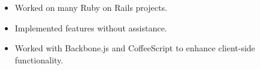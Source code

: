 \documentclass[10pt,letterpaper]{article}
\begin{document}
\begin{itemize}
    \begin{itemize}[label=\textbullet]
      \itemsep0em
      \item Worked on many Ruby on Rails projects.
      \item Implemented features without assistance.
      \item Worked with Backbone.js and CoffeeScript to enhance client-side
      functionality.
    \end{itemize}





  \end{itemize}
\end{document}
